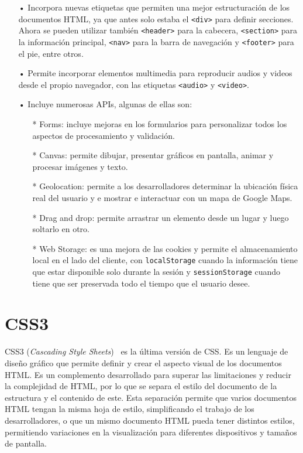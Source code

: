 \documentclass[a4paper, 12pt]{book}
\begin{document}
	\begin{itemize}
	\item[•] Incorpora nuevas etiquetas que permiten una mejor estructuración de los documentos HTML, ya que antes solo estaba el \texttt{<div>} para definir secciones. 
	Ahora se pueden utilizar también \texttt{<header>} para la cabecera, \texttt{<section>} para la información principal, \texttt{<nav>} para la barra de navegación y \texttt{<footer>} para el pie, entre otros.
	\item[•] Permite incorporar elementos multimedia para reproducir audios y videos desde el propio navegador, con las etiquetas \texttt{<audio>} y \texttt{<video>}.
	\item[•] Incluye numerosas APIs, algunas de ellas son:
		\begin{itemize}
		\item[*] Forms: incluye mejoras en los formularios para personalizar todos los aspectos de procesamiento y validación.
		\item[*] Canvas: permite dibujar, presentar gráficos en pantalla, animar y procesar imágenes y texto.
		\item[*] Geolocation: permite a los desarrolladores determinar la ubicación física real del usuario y e mostrar e interactuar con un mapa de Google Maps.
		\item[*] Drag and drop: permite arrastrar un elemento desde un lugar y luego soltarlo en otro.
		\item[*] Web Storage: es una mejora de las cookies y permite el almacenamiento local en el lado del cliente, con \texttt{localStorage} cuando la información tiene que estar disponible solo durante la sesión y \texttt{sessionStorage} cuando tiene que ser preservada todo el tiempo que el usuario desee.
		\end{itemize}
	\end{itemize}


\section{CSS3} 
\label{sec:CSS3}

CSS3 (\emph{Cascading Style Sheets})~\cite{gauchat2012gran} es la última versión de CSS. 
Es un lenguaje de diseño gráfico que permite definir y crear el aspecto visual de los documentos HTML. 
Es un complemento desarrollado para superar las limitaciones y reducir la complejidad de HTML, por lo que se separa el estilo del documento de la estructura y el contenido de este. 
Esta separación permite que varios documentos HTML tengan la misma hoja de estilo, simplificando el trabajo de los desarrolladores, o que un mismo documento HTML pueda tener distintos estilos, permitiendo variaciones en la visualización para diferentes dispositivos y tamaños de pantalla.
\end{document}
